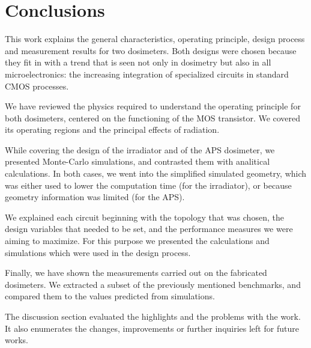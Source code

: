 \section{Conclusions}
This work explains the general characteristics,
operating principle, design process and measurement results
for two dosimeters.
Both designs were chosen because they fit in with a trend that is seen 
not only in dosimetry but also in all microelectronics:
the increasing integration of specialized circuits in standard CMOS processes.

We have reviewed the physics required to understand the operating principle for both dosimeters,
centered on the functioning of the MOS transistor. 
We covered its operating regions and the principal effects of radiation.

While covering the design of the irradiator and of the APS dosimeter,
we presented Monte-Carlo simulations,
and contrasted them with analitical calculations.
In both cases, we went into the simplified simulated geometry,
which was either used to lower the computation time (for the irradiator),
or because geometry information was limited (for the APS).

We explained each circuit beginning with the topology that was chosen,
the design variables that needed to be set,
and the performance measures we were aiming to maximize.
For this purpose we presented the calculations and simulations which were used in the design process.

Finally, we have shown the measurements carried out on the fabricated dosimeters.
We extracted a subset of the previously mentioned benchmarks,
and compared them to the values predicted from simulations.

The discussion section evaluated the highlights and the problems with the work.
It also enumerates the changes, improvements or further inquiries left for future works.

